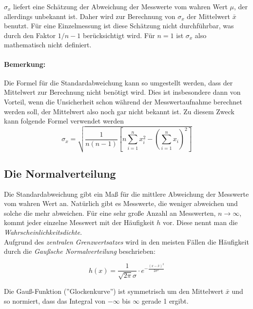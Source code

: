 $\sigma_x$ liefert eine Schätzung der Abweichung der Messwerte vom wahren Wert $\mu$, der allerdings unbekannt ist. Daher wird zur Berechnung von $\sigma_x$ der Mittelwert $\bar{x}$ benutzt. Für eine Einzelmessung ist diese Schätzung nicht durchführbar, was durch den Faktor $1/n-1$ berücksichtigt wird. Für $n=1$ ist $\sigma_x$ also mathematisch nicht definiert.

\paragraph{Bemerkung:}

Die Formel für die Standardabweichung kann so umgestellt werden, dass der Mittelwert zur Berechnung nicht benötigt wird. Dies ist insbesondere dann von Vorteil, wenn die Unsicherheit schon während der Messwertaufnahme berechnet werden soll, der Mittelwert also noch gar nicht bekannt ist. Zu diesem Zweck kann folgende Formel verwendet werden
\begin{equation*}
\sigma_x = \sqrt{\frac{1}{n(n-1)}\left[n\sum_{i=1}^n{x_i^2} - \left(\sum_{i=1}^n{x_i} \right)^2\right]}
\end{equation*}

\subsection{Die Normalverteilung}

Die Standardabweichung gibt ein Maß für die mittlere Abweichung der Messwerte vom wahren Wert an. Natürlich gibt es Messwerte, die weniger abweichen und solche die mehr abweichen. Für eine sehr große Anzahl an Messwerten, $n\rightarrow \infty$, kommt jeder einzelne Messwert mit der Häufigkeit $h$ vor. Diese nennt man die \textit{Wahrscheinlichkeitsdichte}. \\
Aufgrund des \textit{zentralen Grenzwertsatzes} wird in den meisten Fällen die Häufigkeit durch die \textit{Gaußsche Normalverteilung} beschrieben:
\begin{important}
	\begin{equation}
		h(x) = \frac{1}{\sqrt{2\pi}\sigma}\cdot e^{-\frac{\left(x-\bar{x}\right)^2}{2\sigma^2}}
	\end{equation}
\end{important}

Die Gauß-Funktion (''Glockenkurve'')  ist symmetrisch um den Mittelwert $\bar{x}$ und so normiert, dass das Integral von $-\infty$ bis $\infty$ gerade 1 ergibt. 

